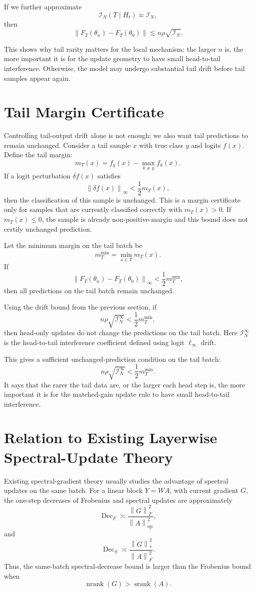 \documentclass{article}
\theoremstyle{definition}
\newcommand{\I}{\mathcal I}
\newcommand{\op}{\mathrm{op}}
\newcommand{\norm}[1]{\left\lVert #1 \right\rVert}
\newcommand{\srank}{\operatorname{srank}}
\newcommand{\nrank}{\operatorname{nrank}}
\begin{document}
If we further approximate
\[
\I_N(T\mid H_t)\approx \I_N,
\]
then
\[
\boxed{
\norm{F_T(\theta_n)-F_T(\theta_0)}
\lesssim
n\rho\sqrt{\I_N}.
}
\]

This shows why tail rarity matters for the local mechanism: the larger \(n\) is, the more important it is for the update geometry to have small head-to-tail interference. Otherwise, the model may undergo substantial tail drift before tail samples appear again.

\section{Tail Margin Certificate}
\label{app:tail-margin}

Controlling tail-output drift alone is not enough; we also want tail predictions to remain unchanged. Consider a tail sample \(x\) with true class \(y\) and logits \(f(x)\). Define the tail margin:
\[
m_T(x)
=
f_y(x)-\max_{k\ne y}f_k(x).
\]
If a logit perturbation \(\delta f(x)\) satisfies
\[
\norm{\delta f(x)}_\infty
<
\frac12 m_T(x),
\]
then the classification of this sample is unchanged.
This is a margin certificate only for samples that are currently classified correctly with \(m_T(x)>0\). If \(m_T(x)\le 0\), the sample is already non-positive-margin and this bound does not certify unchanged prediction.

Let the minimum margin on the tail batch be
\[
m_T^{\min}
=
\min_{x\in T}m_T(x).
\]
If
\[
\norm{F_T(\theta_n)-F_T(\theta_0)}_\infty
<
\frac12m_T^{\min},
\]
then all predictions on the tail batch remain unchanged.

Using the drift bound from the previous section, if
\[
n\rho\sqrt{\I_N^\infty}
<
\frac12m_T^{\min},
\]
then head-only updates do not change the predictions on the tail batch. Here \(\I_N^\infty\) is the head-to-tail interference coefficient defined using logit \(\ell_\infty\) drift.

This gives a sufficient unchanged-prediction condition on the tail batch:
\[
\boxed{
n\rho\sqrt{\I_N^\infty}
<
\frac12m_T^{\min}.
}
\]
It says that the rarer the tail data are, or the larger each head step is, the more important it is for the matched-gain update rule to have small head-to-tail interference.

\section{Relation to Existing Layerwise Spectral-Update Theory}

Existing spectral-gradient theory usually studies the advantage of spectral updates on the same batch. For a linear block \(Y=WA\), with current gradient \(G\), the one-step decreases of Frobenius and spectral updates are approximately
\[
\operatorname{Dec}_F
\asymp
\frac{\norm{G}_F^2}{\norm{A}_{\op}^2},
\]
and
\[
\operatorname{Dec}_S
\asymp
\frac{\norm{G}_*^2}{\norm{A}_F^2}.
\]
Thus, the same-batch spectral-decrease bound is larger than the Frobenius bound when
\[
\nrank(G)>\srank(A).
\]
\end{document}

